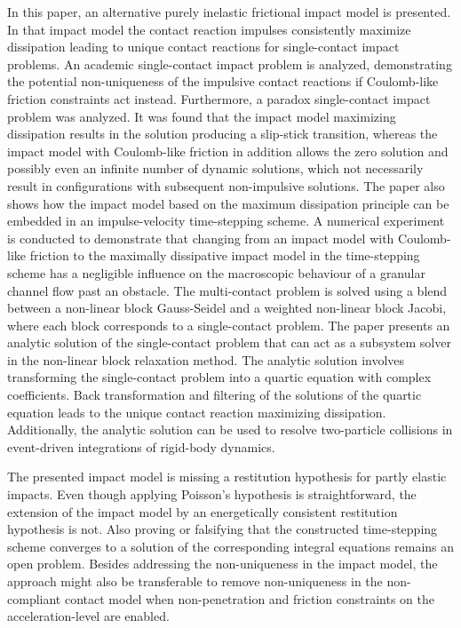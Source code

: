 \documentclass[global,twocolumn]{svjour}
\begin{document}
		In this paper, an alternative purely inelastic frictional impact model is
		presented. In that impact model the contact reaction impulses consistently
		maximize dissipation leading to unique contact reactions for single-contact
		impact problems. An academic single-contact impact problem is analyzed, demonstrating
		the potential non-uniqueness of the impulsive contact reactions if
		Coulomb-like friction constraints act instead. Furthermore, a paradox
		single-contact impact problem was analyzed. It was found that the impact
		model maximizing dissipation results in the solution producing a slip-stick
		transition, whereas the impact model with Coulomb-like friction in addition allows
		the zero solution and possibly even an infinite number of dynamic solutions,
		which not necessarily result in configurations with subsequent
		non-impulsive solutions. The paper also shows how the
		impact model based on the maximum dissipation principle can be embedded
		in an impulse-velocity
		time-stepping scheme. A numerical experiment is conducted to demonstrate
		that changing from an impact model with Coulomb-like friction to the maximally
		dissipative impact model in the time-stepping scheme has a negligible
		influence on the macroscopic behaviour of a granular channel flow past an obstacle.
		The multi-contact problem is solved
		using a blend between a non-linear block Gauss-Seidel and a weighted
		non-linear block Jacobi, where each block corresponds to a single-contact
		problem. The paper presents an analytic solution of the single-contact
		problem that can act as a subsystem solver in the non-linear block
		relaxation method. The analytic solution involves transforming the
		single-contact problem into a quartic equation with complex coefficients.
		Back transformation and filtering of the solutions of the quartic equation
		leads to the unique contact reaction maximizing dissipation. Additionally, the
		analytic solution can be used to resolve two-particle collisions in event-driven
		integrations of rigid-body dynamics.

		The presented impact model is missing a restitution hypothesis for
		partly elastic impacts. Even though applying Poisson's hypothesis is
		straightforward, the extension of the impact model by an energetically consistent restitution hypothesis
		is not. Also proving or falsifying that the constructed time-stepping scheme
		converges to a solution of the corresponding integral equations remains an open
		problem. Besides addressing the non-uniqueness in the impact model, the
		approach might also be transferable to remove non-uniqueness in the
		non-compliant contact model when non-penetration and friction constraints
		on the acceleration-level are enabled.
\end{document}
